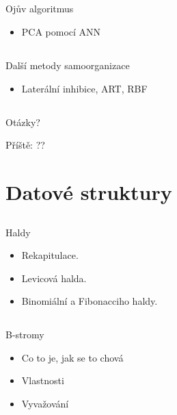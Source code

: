 \documentclass{beamer}
\begin{document}
\subsection{}
\begin{frame}{Ojův algoritmus}
\begin{itemize}
\item PCA pomocí ANN
\end{itemize}
\end{frame}

\subsection{}
\begin{frame}{Další metody samoorganizace}
\begin{itemize}
\item Laterální inhibice, ART, RBF
\end{itemize}
\end{frame}

\subsection{}
\begin{frame}{Otázky?}
\begin{center}
Příště: ??
\end{center}
\end{frame}

\section{Datové struktury}

\subsection{}
\begin{frame}{Haldy}
\begin{itemize}
\item Rekapitulace.
\item Levicová halda.
\item Binomiální a Fibonacciho haldy.
\end{itemize}
\end{frame}

\subsection{}
\begin{frame}{B-stromy}
\begin{itemize}
\item Co to je, jak se to chová
\item Vlastnosti
\item Vyvažování
\end{itemize}
\end{frame}
\end{document}
